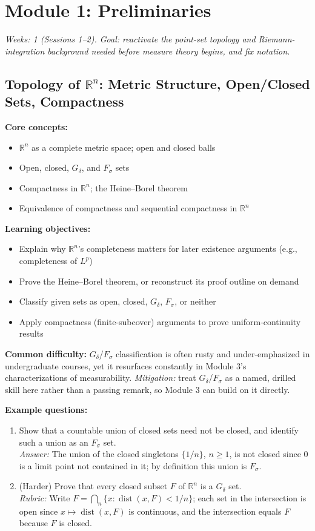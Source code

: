 \documentclass[11pt]{article}
\begin{document}
\section{Module 1: Preliminaries}
\textit{Weeks: 1 (Sessions 1--2). Goal: reactivate the point-set topology and Riemann-integration background needed before measure theory begins, and fix notation.}

\subsection{Topology of $\mathbb{R}^n$: Metric Structure, Open/Closed Sets, Compactness}

\textbf{Core concepts:}
\begin{itemize}[nosep]
\item $\mathbb{R}^n$ as a complete metric space; open and closed balls
\item Open, closed, $G_\delta$, and $F_\sigma$ sets
\item Compactness in $\mathbb{R}^n$; the Heine--Borel theorem
\item Equivalence of compactness and sequential compactness in $\mathbb{R}^n$
\end{itemize}

\textbf{Learning objectives:}
\begin{itemize}[nosep]
\item Explain why $\mathbb{R}^n$'s completeness matters for later existence arguments (e.g., completeness of $L^p$)
\item Prove the Heine--Borel theorem, or reconstruct its proof outline on demand
\item Classify given sets as open, closed, $G_\delta$, $F_\sigma$, or neither
\item Apply compactness (finite-subcover) arguments to prove uniform-continuity results
\end{itemize}

\textbf{Common difficulty:} $G_\delta$/$F_\sigma$ classification is often rusty and under-emphasized in undergraduate courses, yet it resurfaces constantly in Module 3's characterizations of measurability. \textit{Mitigation:} treat $G_\delta$/$F_\sigma$ as a named, drilled skill here rather than a passing remark, so Module 3 can build on it directly.

\textbf{Example questions:}
\begin{enumerate}[nosep]
\item Show that a countable union of closed sets need not be closed, and identify such a union as an $F_\sigma$ set. \\
\textit{Answer:} The union of the closed singletons $\{1/n\}$, $n\ge1$, is not closed since $0$ is a limit point not contained in it; by definition this union is $F_\sigma$.
\item (Harder) Prove that every closed subset $F$ of $\mathbb{R}^n$ is a $G_\delta$ set. \\
\textit{Rubric:} Write $F=\bigcap_n \{x : \operatorname{dist}(x,F)<1/n\}$; each set in the intersection is open since $x\mapsto\operatorname{dist}(x,F)$ is continuous, and the intersection equals $F$ because $F$ is closed.
\end{enumerate}
\end{document}
